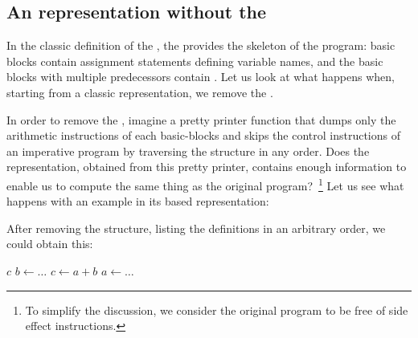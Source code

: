 {\subsection{An \SSA{} representation without the \CFG{}}
In the classic definition of the \SSA{}, the \CFG{} provides the skeleton of the program: 
basic blocks contain assignment statements defining \SSA{} variable names, and the basic blocks with multiple predecessors contain \phinodes. 
Let us look at what happens when, starting from a classic \SSA{} representation, we remove the \CFG{}.

In order to remove the \CFG{}, imagine a pretty printer function that dumps only the arithmetic instructions of each basic-blocks and skips the control instructions of an imperative program by traversing the \CFG{} structure in any order. 
Does the representation, obtained from this pretty printer, contains enough information to enable us to compute the same thing as the original program?~\footnote{To simplify the discussion, we consider the original program to be free of side effect instructions.}
%
Let us see what happens with an example in its \CFG{} based \SSA{} representation:

\centerline{}

\noindent
After removing the \CFG{} structure, listing the definitions in an arbitrary order, we could obtain this:

\begin{algorithm}[H]
\Return $c$\;
$b \gets \ldots$ 
$c \gets a + b$\;
$a \gets \ldots$ 
\end{algorithm}


}
